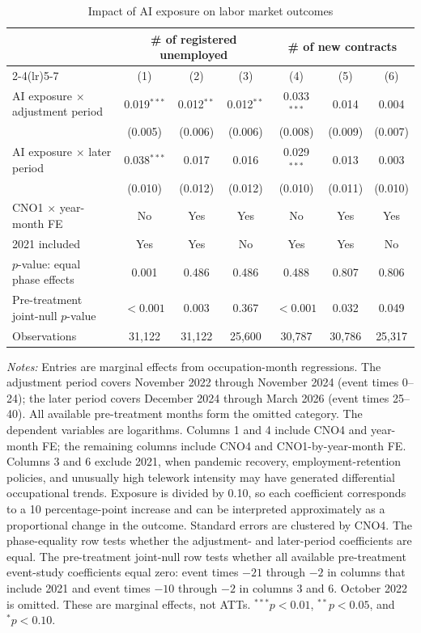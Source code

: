 \begin{table}[!htbp]
\centering
\caption{Impact of AI exposure on labor market outcomes}
\label{tab:v1_main_effects}
\begin{threeparttable}
\scriptsize
\setlength{\tabcolsep}{3.5pt}
\begin{tabular}{lcccccc}
\toprule
& \multicolumn{3}{c}{\# of registered unemployed} & \multicolumn{3}{c}{\# of new contracts} \\
\cmidrule(lr){2-4}\cmidrule(lr){5-7}
& (1) & (2) & (3) & (4) & (5) & (6) \\
\midrule
AI exposure $\times$ adjustment period & 0.019$^{***}$ & 0.012$^{**}$ & 0.012$^{**}$ & 0.033$^{***}$ & 0.014 & 0.004 \\
 & (0.005) & (0.006) & (0.006) & (0.008) & (0.009) & (0.007) \\
AI exposure $\times$ later period & 0.038$^{***}$ & 0.017 & 0.016 & 0.029$^{***}$ & 0.013 & 0.003 \\
 & (0.010) & (0.012) & (0.012) & (0.010) & (0.011) & (0.010) \\
\midrule
CNO1 $\times$ year-month FE & No & Yes & Yes & No & Yes & Yes \\
2021 included & Yes & Yes & No & Yes & Yes & No \\
$p$-value: equal phase effects & 0.001 & 0.486 & 0.486 & 0.488 & 0.807 & 0.806 \\
Pre-treatment joint-null $p$-value & $<0.001$ & 0.003 & 0.367 & $<0.001$ & 0.032 & 0.049 \\
Observations & 31,122 & 31,122 & 25,600 & 30,787 & 30,786 & 25,317 \\
\bottomrule
\end{tabular}
\begin{tablenotes}[flushleft]
\footnotesize
\item \emph{Notes:} Entries are marginal effects from occupation-month regressions. The adjustment period covers November 2022 through November 2024 (event times 0--24); the later period covers December 2024 through March 2026 (event times 25--40). All available pre-treatment months form the omitted category. The dependent variables are logarithms. Columns 1 and 4 include CNO4 and year-month FE; the remaining columns include CNO4 and CNO1-by-year-month FE. Columns 3 and 6 exclude 2021, when pandemic recovery, employment-retention policies, and unusually high telework intensity may have generated differential occupational trends. Exposure is divided by 0.10, so each coefficient corresponds to a 10 percentage-point increase and can be interpreted approximately as a proportional change in the outcome. Standard errors are clustered by CNO4. The phase-equality row tests whether the adjustment- and later-period coefficients are equal. The pre-treatment joint-null row tests whether all available pre-treatment event-study coefficients equal zero: event times $-21$ through $-2$ in columns that include 2021 and event times $-10$ through $-2$ in columns 3 and 6. October 2022 is omitted. These are marginal effects, not ATTs. $^{***}p<0.01$, $^{**}p<0.05$, and $^{*}p<0.10$.
\end{tablenotes}
\end{threeparttable}
\end{table}
